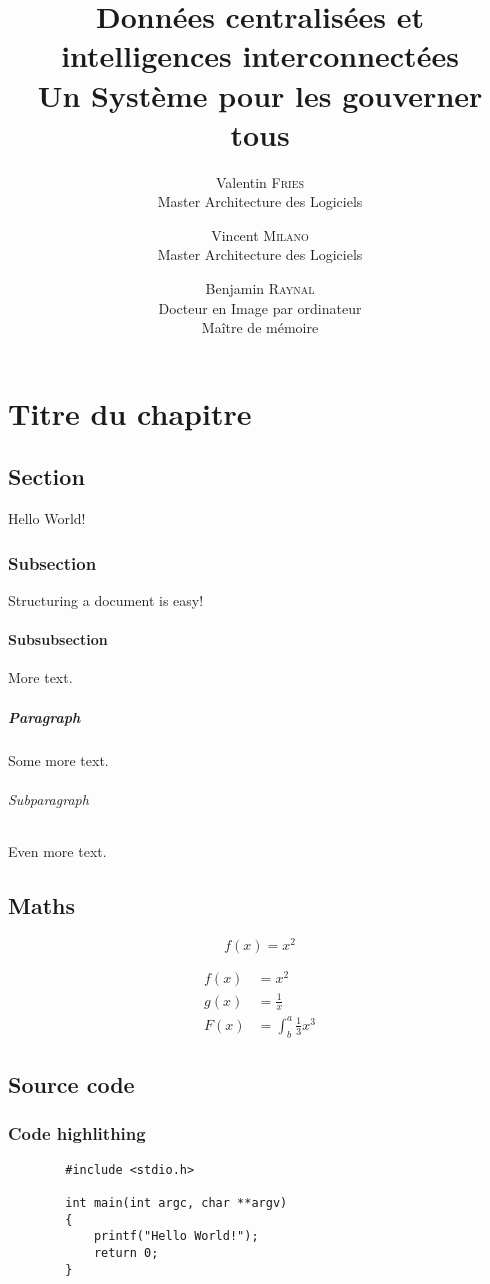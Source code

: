 \documentclass{report}
\title{
    \huge Données centralisées et intelligences interconnectées \\
    \LARGE Un Système pour les gouverner tous
}
\author{
    Valentin \textsc{Fries} \\ Master Architecture des Logiciels 
    \and
    Vincent \textsc{Milano} \\ Master Architecture des Logiciels
    \and
    Benjamin \textsc{Raynal} \\ Docteur en Image par ordinateur \\ Maître de mémoire
}
\begin{document}
\maketitle

\newpage
\tableofcontents

\newpage
{}

\chapter{Titre du chapitre}
    \section{Section}
    Hello World!

        \subsection{Subsection}
        Structuring a document is easy!

            \subsubsection{Subsubsection}
            More text.

            \paragraph{Paragraph}
            Some more text.

                \subparagraph{Subparagraph}
                Even more text.

    \section{Maths}
    \begin{equation*}
        f(x) = x^2
    \end{equation*}

    \begin{align*}
        f(x) &= x^2\\
        g(x) &= \frac{1}{x}\\
        F(x) &= \int^a_b \frac{1}{3}x^3
    \end{align*}

    \section{Source code}
    \subsection{Code highlithing}
    \begin{lstlisting}
        #include <stdio.h>

        int main(int argc, char **argv)
        {
            printf("Hello World!");
            return 0;
        }
    \end{lstlisting}
\end{document}
